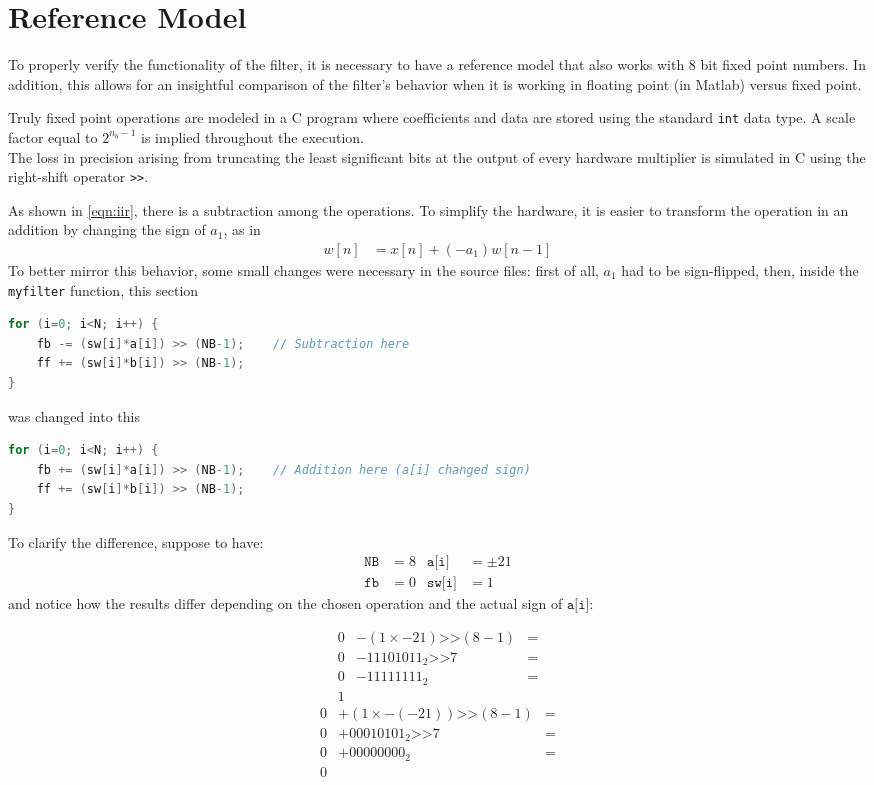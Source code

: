 \section{Reference Model}
To properly verify the functionality of the filter, it is necessary to have a reference model that also works with 8 bit fixed point numbers. In addition, this allows for an insightful comparison of the filter's behavior when it is working in floating point (in Matlab) versus fixed point.


Truly fixed point operations are modeled in a C program where coefficients and data are stored using the standard \texttt{int} data type. A scale factor equal to $2^{n_b-1}$ is implied throughout the execution.\\
The loss in precision arising from truncating the least significant bits at the output of every hardware multiplier is simulated in C using the right-shift operator \texttt{>>}.

As shown in \autoref{eqn:iir}, there is a subtraction among the operations. To simplify the hardware, it is easier to transform the operation in an addition by changing the sign of $a_1$, as in
\begin{align}
	w[n] &= x[n] + (- a_1) w[n-1]
\end{align}
To better mirror this behavior, some small changes were necessary in the source files: first of all, $a_1$ had to be sign-flipped, then, inside the \texttt{myfilter} function, this section
\begin{lstlisting}[language=C]
for (i=0; i<N; i++) {
	fb -= (sw[i]*a[i]) >> (NB-1);    // Subtraction here
	ff += (sw[i]*b[i]) >> (NB-1);
}
\end{lstlisting}
was changed into this
\begin{lstlisting}[language=C]
for (i=0; i<N; i++) {
	fb += (sw[i]*a[i]) >> (NB-1);    // Addition here (a[i] changed sign)
	ff += (sw[i]*b[i]) >> (NB-1);
}
\end{lstlisting}
To clarify the difference, suppose to have:
\begin{align*}
	\texttt{NB} &= 8 & \texttt{a[i]} &= \pm21 \\
	\texttt{fb} &= 0 & \texttt{sw[i]} &= 1
\end{align*}
and notice how the results differ depending on the chosen operation and the actual sign of $\texttt{a[i]}$:
\setlength{\columnseprule}{0.4pt}
\begin{multicols}{2}
	\noindent
	\begin{align*}
		0 &- (1 \times -21) \texttt{>>} (8 - 1) &= \\
		0 &- 11101011_2 \texttt{>>} 7 &= \\
		0 &- 11111111_2 &= \\
		1&
	\end{align*}
	\begin{align*}
		0 &+ (1 \times -(-21)) \texttt{>>} (8 - 1) &= \\
		0 &+ 00010101_2 \texttt{>>} 7 &= \\
		0 &+ 00000000_2 &= \\
		0&
	\end{align*}
\end{multicols}
